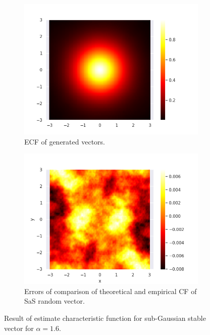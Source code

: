 \documentclass{article}
\begin{document}
	\begin{figure}[H]
		\centering
		\begin{subfigure}{0.49\textwidth}
			\centering
			\includegraphics[width=1\linewidth]{images/ex_2_ecf}
			\caption{ECF of generated vectors.}\label{7}
		\end{subfigure}
		\hfill
		\begin{subfigure}{0.49\textwidth}
			\centering
			\includegraphics[width=1\linewidth]{images/ex_2_error_heatmap}
			\caption{Errors of comparison of theoretical and empirical CF of SaS random vector.}\label{8}
		\end{subfigure}
		\caption{Result of estimate characteristic function for sub-Gaussian stable vector for $\alpha = 1.6$.}
	\end{figure}
	
\end{document}
